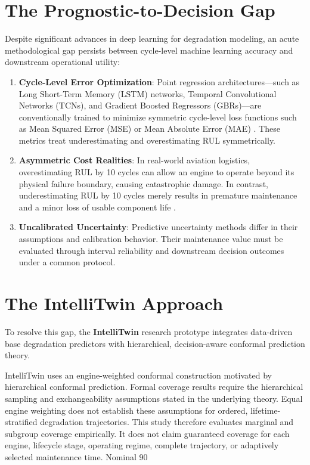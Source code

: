 \section{The Prognostic-to-Decision Gap}
Despite significant advances in deep learning for degradation modeling, an acute methodological gap persists between cycle-level machine learning accuracy and downstream operational utility:
\begin{enumerate}
    \item \textbf{Cycle-Level Error Optimization}: Point regression architectures—such as Long Short-Term Memory (LSTM) networks, Temporal Convolutional Networks (TCNs), and Gradient Boosted Regressors (GBRs)—are conventionally trained to minimize symmetric cycle-level loss functions such as Mean Squared Error (MSE) or Mean Absolute Error (MAE) \cite{saxena2008damage, diao2026turbofan}. These metrics treat underestimating and overestimating RUL symmetrically.
    \item \textbf{Asymmetric Cost Realities}: In real-world aviation logistics, overestimating RUL by 10 cycles can allow an engine to operate beyond its physical failure boundary, causing catastrophic damage. In contrast, underestimating RUL by 10 cycles merely results in premature maintenance and a minor loss of usable component life \cite{saxena2008damage, robinson2026riskaware}.
    \item \textbf{Uncalibrated Uncertainty}: Predictive uncertainty methods differ in their assumptions and calibration behavior. Their maintenance value must be evaluated through interval reliability and downstream decision outcomes under a common protocol.
\end{enumerate}

\section{The IntelliTwin Approach}
To resolve this gap, the \textbf{IntelliTwin} research prototype integrates data-driven base degradation predictors with hierarchical, decision-aware conformal prediction theory.

IntelliTwin uses an engine-weighted conformal construction motivated by hierarchical conformal prediction. Formal coverage results require the hierarchical sampling and exchangeability assumptions stated in the underlying theory. Equal engine weighting does not establish these assumptions for ordered, lifetime-stratified degradation trajectories. This study therefore evaluates marginal and subgroup coverage empirically. It does not claim guaranteed coverage for each engine, lifecycle stage, operating regime, complete trajectory, or adaptively selected maintenance time. Nominal 90%

